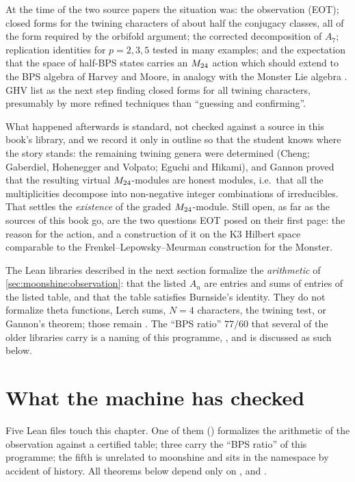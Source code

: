 At the time of the two source papers the situation was: the observation (EOT); closed
forms for the twining characters of about half the conjugacy classes, all of the form
required by the orbifold argument; the corrected decomposition of $A_7$; replication
identities for $p=2,3,5$ tested in many examples; and the expectation that
the space of half-BPS states carries an $M_{24}$ action which should extend to the BPS
algebra of Harvey and Moore, in analogy with the Monster Lie algebra
. GHV list as the next step finding closed forms for all
twining characters, presumably by more refined techniques than ``guessing and confirming''.

What happened afterwards is standard, not checked against a source in this book's
library, and we record it only in outline so that the student knows where the story stands:
the remaining twining genera were determined (Cheng; Gaberdiel, Hohenegger and Volpato;
Eguchi and Hikami), and Gannon proved that the resulting virtual $M_{24}$-modules are honest
modules, i.e.\ that all the multiplicities decompose into non-negative integer combinations
of irreducibles. That settles the \emph{existence} of the graded $M_{24}$-module. Still open,
as far as the sources of this book go, are the two questions EOT posed on their first
page: the reason for the action, and a construction of it on the K3 Hilbert space
comparable to the Frenkel--Lepowsky--Meurman construction for the Monster.

\begin{remark}\label{rem:moonshine:programme}
The Lean libraries described in the next section formalize the \emph{arithmetic} of
\cref{sec:moonshine:observation}: that the listed $A_n$ are entries and sums of entries of the
listed table, and that the table satisfies Burnside's identity. They do not formalize theta
functions, Lerch sums, $N=4$ characters, the twining test, or Gannon's theorem; those
remain \TL. The ``BPS ratio'' $77/60$ that several of the older libraries carry is a
naming of this programme, \TC, and is discussed as such below.
\end{remark}

\section{What the machine has checked}\label{sec:moonshine:lean}

Five Lean files touch this chapter. One of them ()
formalizes the arithmetic of the observation against a certified table; three carry the
``BPS ratio'' of this programme; the fifth is unrelated to moonshine and sits in the
 namespace by accident of history. All theorems below depend only on
,  and .

